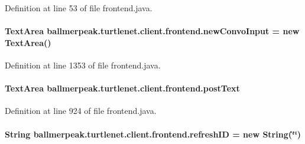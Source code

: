 Definition at line 53 of file frontend.\-java.

\hypertarget{classballmerpeak_1_1turtlenet_1_1client_1_1frontend_a3a97955a4caeb2d7eec937a55e0f1505}{
\paragraph[{new\-Convo\-Input}]{\setlength{\rightskip}{0pt plus 5cm}Text\-Area ballmerpeak.\-turtlenet.\-client.\-frontend.\-new\-Convo\-Input = new Text\-Area()\hspace{0.3cm}{\ttfamily [private]}}}\label{classballmerpeak_1_1turtlenet_1_1client_1_1frontend_a3a97955a4caeb2d7eec937a55e0f1505}


Definition at line 1353 of file frontend.\-java.

\hypertarget{classballmerpeak_1_1turtlenet_1_1client_1_1frontend_af105d0e6450c2caedeaee033e8f5d444}{
\paragraph[{post\-Text}]{\setlength{\rightskip}{0pt plus 5cm}Text\-Area ballmerpeak.\-turtlenet.\-client.\-frontend.\-post\-Text\hspace{0.3cm}{\ttfamily [private]}}}\label{classballmerpeak_1_1turtlenet_1_1client_1_1frontend_af105d0e6450c2caedeaee033e8f5d444}


Definition at line 924 of file frontend.\-java.

\hypertarget{classballmerpeak_1_1turtlenet_1_1client_1_1frontend_a280a54ef9864d0adbd9a44e32b7a4775}{
\paragraph[{refresh\-I\-D}]{\setlength{\rightskip}{0pt plus 5cm}String ballmerpeak.\-turtlenet.\-client.\-frontend.\-refresh\-I\-D = new String(\char`\"{}\char`\"{})\hspace{0.3cm}{\ttfamily [private]}}}\label{classballmerpeak_1_1turtlenet_1_1client_1_1frontend_a280a54ef9864d0adbd9a44e32b7a4775}


